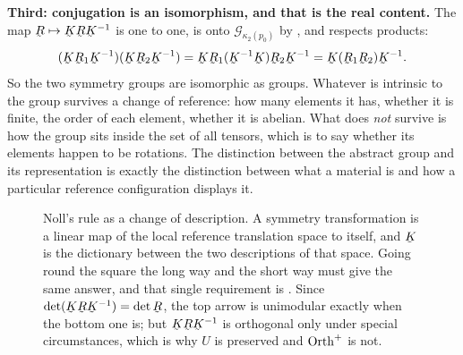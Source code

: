 \medskip
\noindent\textbf{Third: conjugation is an isomorphism, and that is the
real content.} The map $\bR\mapsto\bK\bR\bK^{-1}$ is one to one, is onto
$\mathcal{G}_{\kappa_{2}(p_{0})}$ by , and respects products:
\[
   (\bK\bR_{1}\bK^{-1})(\bK\bR_{2}\bK^{-1})
   =\bK\bR_{1}(\bK^{-1}\bK)\bR_{2}\bK^{-1}
   =\bK(\bR_{1}\bR_{2})\bK^{-1}.
\]
So the two symmetry groups are isomorphic as groups. Whatever is
intrinsic to the group survives a change of reference: how many elements
it has, whether it is finite, the order of each element, whether it is
abelian. What does \emph{not} survive is how the group sits inside the
set of all tensors, which is to say whether its elements happen to be
rotations. The distinction between the abstract group and its
representation is exactly the distinction between what a material is and
how a particular reference configuration displays it.

\begin{figure}[htbp]\centering
\renewcommand{\thefigure}{B}
\caption{Noll's rule as a change of description. A symmetry
transformation is a linear map of the local reference translation space
to itself, and $\bK$ is the dictionary between the two descriptions of
that space. Going round the square the long way and the short way must
give the same answer, and that single requirement is . Since
$\det(\bK\bR\bK^{-1})=\det\bR$, the top arrow is unimodular exactly when
the bottom one is; but $\bK\bR\bK^{-1}$ is orthogonal only under special
circumstances, which is why $U$ is preserved and $\operatorname{Orth}^{+}$ is not.}
\label{fig:ch8noll}
\end{figure}

